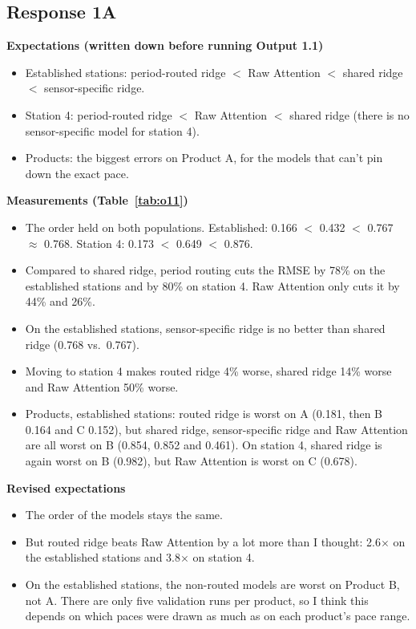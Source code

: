 \documentclass[10pt]{article}
\begin{document}
\subsection*{Response 1A}
\textbf{Expectations (written down before running Output 1.1)}
\begin{itemize}
\item Established stations: period-routed ridge $<$ Raw Attention $<$ shared ridge $<$ sensor-specific ridge.
\item Station 4: period-routed ridge $<$ Raw Attention $<$ shared ridge (there is no sensor-specific model for station 4).
\item Products: the biggest errors on Product A, for the models that can't pin down the exact pace.
\end{itemize}
\textbf{Measurements (Table~\ref{tab:o11})}
\begin{itemize}
\item The order held on both populations. Established: 0.166 $<$ 0.432 $<$ 0.767 $\approx$ 0.768. Station 4: 0.173 $<$ 0.649 $<$ 0.876.
\item Compared to shared ridge, period routing cuts the RMSE by 78\% on the established stations and by 80\% on station 4. Raw Attention only cuts it by 44\% and 26\%.
\item On the established stations, sensor-specific ridge is no better than shared ridge (0.768 vs.\ 0.767).
\item Moving to station 4 makes routed ridge 4\% worse, shared ridge 14\% worse and Raw Attention 50\% worse.
\item Products, established stations: routed ridge is worst on A (0.181, then B 0.164 and C 0.152), but shared ridge, sensor-specific ridge and Raw Attention are all worst on B (0.854, 0.852 and 0.461). On station 4, shared ridge is again worst on B (0.982), but Raw Attention is worst on C (0.678).
\end{itemize}
\textbf{Revised expectations}
\begin{itemize}
\item The order of the models stays the same.
\item But routed ridge beats Raw Attention by a lot more than I thought: 2.6$\times$ on the established stations and 3.8$\times$ on station 4.
\item On the established stations, the non-routed models are worst on Product B, not A. There are only five validation runs per product, so I think this depends on which paces were drawn as much as on each product's pace range.
\end{itemize}
\end{document}
